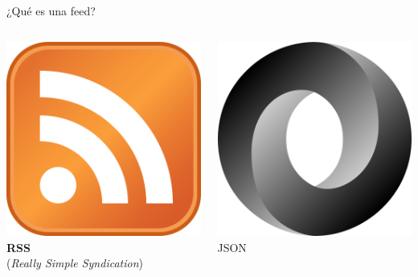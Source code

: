 \documentclass{beamer}
\begin{document}
\begin{frame}{¿Qué es una feed?}
{      \begin{columns}[t]
        \begin{column}{.49\textwidth}
          \centering
          \hyperlink{rss}{\includegraphics{rss-logo.png}}\\[.5em]
          \textbf{RSS}\\{\footnotesize(\textit{Really Simple Syndication})}
        \end{column}
        \begin{column}{.49\textwidth}
          \centering
          \includegraphics[scale=.8]{json-logo.png}\\[.5em]
          JSON
        \end{column}
      \end{columns}
    }
  \end{frame}
\end{document}
